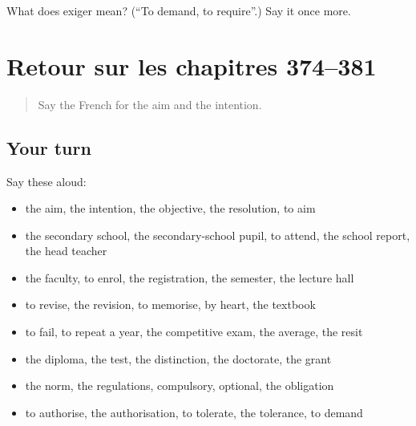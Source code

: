 \begin{tcolorbox}[breakable,colback=teal!4,colframe=teal!35!black,title={Before you move on}]
What does exiger mean? (\textquotedblleft{}To demand, to require\textquotedblright{}.) Say it once more.
\end{tcolorbox}
\section[(dialogue)]{Retour sur les chapitres 374–381}

\label{lesson:FR-R381-revision-374-381}



\begin{quote}
Say the French for the aim and the intention.
\end{quote}

\subsection*{Your turn}
Say these aloud:

\begin{itemize}
\raggedright
  \item the aim, the intention, the objective, the resolution, to aim
  \item the secondary school, the secondary-school pupil, to attend, the school report, the head teacher
  \item the faculty, to enrol, the registration, the semester, the lecture hall
  \item to revise, the revision, to memorise, by heart, the textbook
  \item to fail, to repeat a year, the competitive exam, the average, the resit
  \item the diploma, the test, the distinction, the doctorate, the grant
  \item the norm, the regulations, compulsory, optional, the obligation
  \item to authorise, the authorisation, to tolerate, the tolerance, to demand
\end{itemize}

